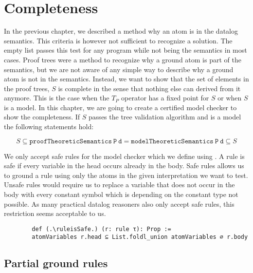 \section{Completeness}\label{sec:completeness}

    In the previous chapter, we described a method why an atom is in the datalog semantics. This criteria is however not sufficient to recognize a solution. The empty list passes this test for any program while not being the semantics in most cases. Proof trees were a method to recognize why a ground atom is part of the semantics, but we are not aware of any simple way to describe why a ground atom is not in the semantics. Instead, we want to show that the set of elements in the proof trees, $S$ is complete in the sense that nothing else can derived from it anymore. This is the case when the $T_P$ operator has a fixed point for $S$ or when $S$ is a model. In this chapter, we are going to create a certified model checker to show the completeness. If $S$ passes the tree validation algorithm and is a model the following statements hold:

    \[ S \subseteq \mathtt{proofTheoreticSemantics\ P\ d} = \mathtt{modelTheoreticSemantics\ P\ d} \subseteq S \]

    We only accept safe rules for the model checker which we define using \atomVariables. A rule is safe if every variable in the head occurs already in the body. Safe rules allows us to ground a rule using only the atoms in the given interpretation we want to test. Unsafe rules would require us to replace a variable that does not occur in the body with every constant symbol which is depending on the constant type not possible. As many practical datalog reasoners also only accept safe rules, this restriction seems acceptable to us.

    \begin{lstlisting}
        def (.\ruleisSafe.) (r: rule τ): Prop := 
        atomVariables r.head ⊆ List.foldl_union atomVariables ∅ r.body

    \end{lstlisting}

    \subsection{Partial ground rules}
    
